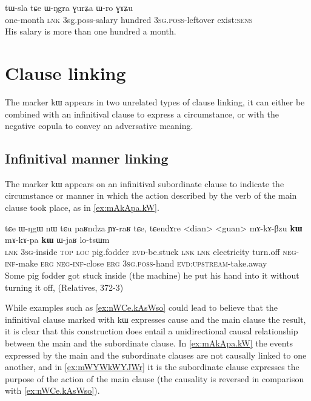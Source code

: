 \documentclass[oldfontcommands,oneside,a4paper,11pt]{article}
\newcommand{\ipa}[1]{{\phon #1}} %
\begin{document}
 \begin{exe} 
\ex \label{ex:tWsla.tCe}
\gll  
  \ipa{tɯ-sla} \ipa{tɕe} \ipa{ɯ-ŋgra} \ipa{ɣurʑa} \ipa{ɯ-ro} \ipa{ɣɤʑu} \\
  one-month \textsc{lnk} 3sg.poss-salary hundred \textsc{3sg.poss}-leftover exist:\textsc{sens} \\
  \glt His salary is more than one hundred a month.
  \end{exe}  
 \section{Clause linking} \label{sec:linking}
 The marker \ipa{kɯ} appears in two unrelated types of clause linking, it can either be combined with an infinitival clause to express a circumstance, or with the negative copula to convey an adversative meaning.
 
 \subsection{Infinitival manner linking} \label{sec:manner}
The marker \ipa{kɯ}  appears on an infinitival subordinate clause  to indicate the circumstance or manner in which the action described by the verb of the main clause took place, as in \ref{ex:mAkApa.kW}. 

\begin{exe}
\ex \label{ex:mAkApa.kW}
\gll
\ipa{tɕe}   	\ipa{ɯ-ŋgɯ}   	\ipa{nɯ} \ipa{tɕu}   	\ipa{paʁndza}   	\ipa{ɲɤ-raʁ}   	\ipa{tɕe,}   	\ipa{tɕendɤre}   	<dian>   	<guan>   	\ipa{mɤ-kɤ-βzu} 	\ipa{\textbf{kɯ}}   	\ipa{mɤ-kɤ-pa}   	\ipa{\textbf{kɯ}}   	\ipa{ɯ-jaʁ}   	\ipa{lo-tsɯm}   \\
\textsc{lnk} \textsc{3sg}-inside \textsc{top} \textsc{loc} pig.fodder \textsc{evd}-be.stuck \textsc{lnk}
\textsc{lnk} electricity turn.off \textsc{neg-inf}-make \textsc{erg}  \textsc{neg-inf}-close \textsc{erg}  \textsc{3sg.poss}-hand \textsc{evd:upstream}-take.away \\
\glt Some pig fodder got stuck inside (the machine) he put his hand into it without turning it off, (Relatives, 372-3)
\end{exe} 

 While  examples such as \ref{ex:nWCe.kAsWso} could lead to believe that the infinitival clause marked with \ipa{kɯ}  expresses  cause and the main clause the result, it is clear that this construction does entail a unidirectional causal relationship between the main and the subordinate clause. In \ref{ex:mAkApa.kW} the events expressed by the main and the subordinate clauses are not causally linked to one another, and in  \ref{ex:mWYWkWYJWr} it is the subordinate clause expresses the purpose of the action of the main clause (the causality is reversed in comparison with \ref{ex:nWCe.kAsWso}).
\end{document}

